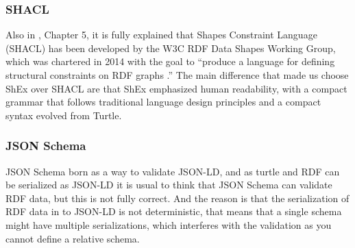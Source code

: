 \subsubsection{SHACL}
Also in , Chapter 5, it is fully explained that Shapes Constraint Language (SHACL) has been developed by the W3C RDF Data Shapes Working Group, which was chartered in 2014 with the goal to “produce a language for defining structural constraints on RDF graphs .”
The main difference that made us choose ShEx over SHACL are that ShEx emphasized human readability, with a compact grammar that follows traditional language design principles and a compact syntax evolved from Turtle.

\subsubsection{JSON Schema}
JSON Schema born as a way to validate JSON-LD, and as turtle and RDF can be serialized as JSON-LD it is usual to think that JSON Schema can validate RDF data, but this is not fully correct. And the reason is that the serialization of RDF data in to JSON-LD is not deterministic, that means that a single schema might have multiple serializations, which interferes with the validation as you cannot define a relative schema.
